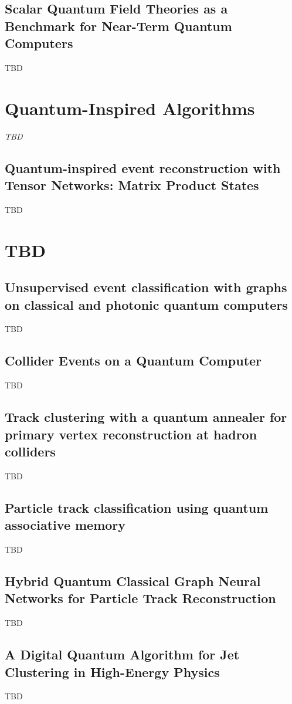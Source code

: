 \subsection{Scalar Quantum Field Theories as a Benchmark for Near-Term Quantum Computers~\cite{Yeter-Aydeniz:2018mix}}
TBD


\section{Quantum-Inspired Algorithms}

\textit{TBD}

\subsection{Quantum-inspired event reconstruction with Tensor Networks: Matrix Product States~\cite{Araz:2021zwu}}
TBD


\section{TBD}

\subsection{Unsupervised event classification with graphs on classical and photonic quantum computers~\cite{Blance:2020ktp}}
TBD
\subsection{Collider Events on a Quantum Computer~\cite{Gustafson:2022xwt}}
TBD
\subsection{Track clustering with a quantum annealer for primary vertex reconstruction at hadron colliders~\cite{Das:2019hrw}}
TBD
\subsection{Particle track classification using quantum associative memory~\cite{Quiroz:2020jmp}}
TBD
\subsection{Hybrid Quantum Classical Graph Neural Networks for Particle Track Reconstruction~\cite{Tuysuz:2021oai}}
TBD
\subsection{A Digital Quantum Algorithm for Jet Clustering in High-Energy Physics~\cite{Pires:2021fka}}
TBD
